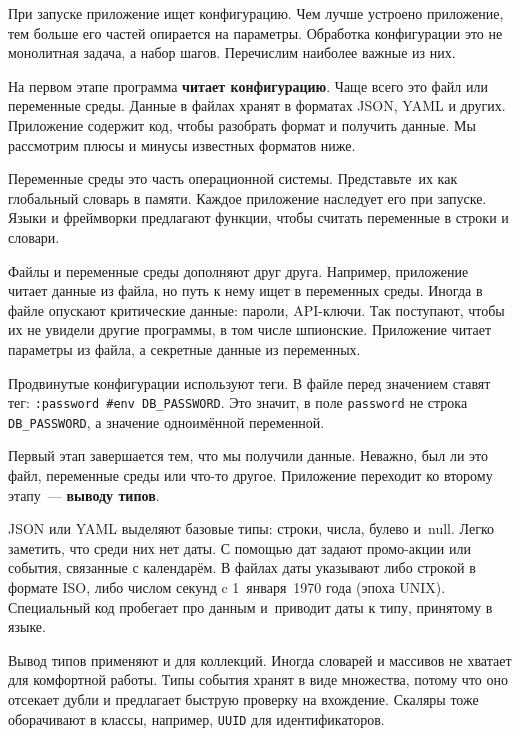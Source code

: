 При запуске приложение ищет конфигурацию. Чем лучше устроено приложение, тем
больше его частей опирается на параметры. Обработка конфигурации это не
монолитная задача, а набор шагов. Перечислим наиболее важные из них.

На первом этапе программа \textbf{читает конфигурацию}. Чаще всего это файл или
переменные среды. Данные в файлах хранят в форматах JSON, YAML и
других. Приложение содержит код, чтобы разобрать формат и получить данные. Мы
рассмотрим плюсы и минусы известных форматов ниже.

Переменные среды это часть операционной системы. Представьте~их как глобальный
словарь в памяти. Каждое приложение наследует его при запуске. Языки и
фреймворки предлагают функции, чтобы считать переменные в строки и словари.

Файлы и переменные среды дополняют друг друга. Например, приложение читает
данные из файла, но путь к нему ищет в переменных среды. Иногда в файле опускают
критические данные: пароли, API-ключи. Так поступают, чтобы их не увидели другие
программы, в том числе шпионские. Приложение читает параметры из файла, а
секретные данные из переменных.


Продвинутые конфигурации используют теги. В файле перед значением
ставят тег: \verb|:password #env DB_PASSWORD|. Это значит, в поле
\verb|password| не строка \verb|DB_PASSWORD|, а значение одноимённой
переменной.

Первый этап завершается тем, что мы получили данные. Неважно, был ли это файл,
переменные среды или что-то другое. Приложение переходит ко второму этапу~---
\textbf{выводу типов}.


JSON или YAML выделяют базовые типы: строки, числа, булево и~null. Легко
заметить, что среди них нет даты. С помощью дат задают промо-акции или события,
связанные с календарём. В файлах даты указывают либо строкой в формате ISO, либо
числом секунд c 1~января~1970 года (эпоха UNIX).
Специальный код пробегает про данным и~приводит даты к типу, принятому в языке.

Вывод типов применяют и для коллекций. Иногда словарей и массивов не хватает для
комфортной работы. Типы события хранят в виде множества, потому что оно отсекает
дубли и предлагает быструю проверку на вхождение. Скаляры тоже оборачивают в
классы, например, \verb|UUID| для идентификаторов.

